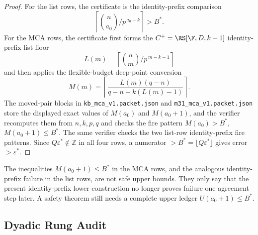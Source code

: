 \begin{proof}
For the list rows, the certificate is the identity-prefix comparison
\[
        \left\lceil \binom n{a_0}/p^{\,a_0-k}\right\rceil > B^*.
\]
For the MCA rows, the certificate first forms the \(C^+=\RS[\F,D,k+1]\)
identity-prefix list floor
\[
        L(m)=
        \left\lceil \binom n m / p^{\,m-k-1}\right\rceil
\]
and then applies the flexible-budget deep-point conversion
\[
        M(m)=
        \left\lceil
        \frac{L(m)(q-n)}{q-n+k(L(m)-1)}
        \right\rceil .
\]
The moved-pair blocks in
\texttt{kb\_mca\_v1.packet.json} and
\texttt{m31\_mca\_v1.packet.json} store the displayed exact values of
\(M(a_0)\) and \(M(a_0+1)\), and the verifier recomputes them from
\(n,k,p,q\) and checks the fire pattern \(M(a_0)>B^*\), \(M(a_0+1)\le B^*\).
The same verifier checks the two list-row identity-prefix fire patterns.
Since \(Q\varepsilon^*\notin\mathbb Z\) in all four rows, a numerator
\(>B^*=\lfloor Q\varepsilon^*\rfloor\) gives error \(>\varepsilon^*\).
\end{proof}

\begin{remark}
\label{rem:finite-lower-route-failure}
The inequalities \(M(a_0+1)\le B^*\) in the MCA rows, and the analogous
identity-prefix failure in the list rows, are not safe upper bounds.  They
only say that the present identity-prefix lower construction no longer proves
failure one agreement step later.  A safety theorem still needs a complete
upper ledger \(U(a_0+1)\le B^*\).
\end{remark}

\subsection{Dyadic Rung Audit}

